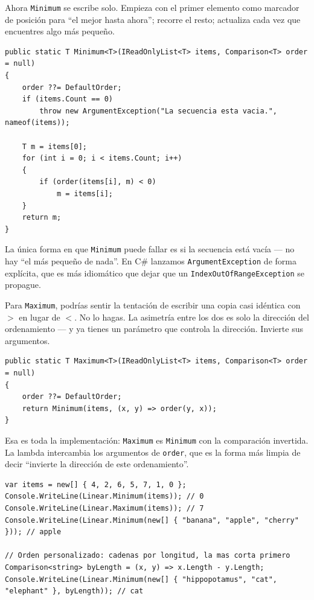 \documentclass[11pt,a4paper]{article}
\begin{document}
Ahora \texttt{Minimum} se escribe solo. Empieza con el primer elemento como marcador de posición para ``el mejor hasta ahora''; recorre el resto; actualiza cada vez que encuentres algo más pequeño.

\begin{lstlisting}[caption={\texttt{Minimum} con comparación parametrizada}]
public static T Minimum<T>(IReadOnlyList<T> items, Comparison<T> order = null)
{
    order ??= DefaultOrder;
    if (items.Count == 0)
        throw new ArgumentException("La secuencia esta vacia.", nameof(items));

    T m = items[0];
    for (int i = 0; i < items.Count; i++)
    {
        if (order(items[i], m) < 0)
            m = items[i];
    }
    return m;
}
\end{lstlisting}

La única forma en que \texttt{Minimum} puede fallar es si la secuencia está vacía --- no hay ``el más pequeño de nada''. En C\# lanzamos \texttt{ArgumentException} de forma explícita, que es más idiomático que dejar que un \texttt{IndexOutOfRangeException} se propague.

Para \texttt{Maximum}, podrías sentir la tentación de escribir una copia casi idéntica con $>$ en lugar de $<$. No lo hagas. La asimetría entre los dos es solo la dirección del ordenamiento --- y ya tienes un parámetro que controla la dirección. Invierte sus argumentos.

\begin{lstlisting}[caption={\texttt{Maximum} = \texttt{Minimum} con el orden invertido}]
public static T Maximum<T>(IReadOnlyList<T> items, Comparison<T> order = null)
{
    order ??= DefaultOrder;
    return Minimum(items, (x, y) => order(y, x));
}
\end{lstlisting}

Esa es toda la implementación: \texttt{Maximum} es \texttt{Minimum} con la comparación invertida. La lambda intercambia los argumentos de \texttt{order}, que es la forma más limpia de decir ``invierte la dirección de este ordenamiento''.

\begin{lstlisting}
var items = new[] { 4, 2, 6, 5, 7, 1, 0 };
Console.WriteLine(Linear.Minimum(items)); // 0
Console.WriteLine(Linear.Maximum(items)); // 7
Console.WriteLine(Linear.Minimum(new[] { "banana", "apple", "cherry" })); // apple

// Orden personalizado: cadenas por longitud, la mas corta primero
Comparison<string> byLength = (x, y) => x.Length - y.Length;
Console.WriteLine(Linear.Minimum(new[] { "hippopotamus", "cat", "elephant" }, byLength)); // cat
\end{lstlisting}
\end{document}
